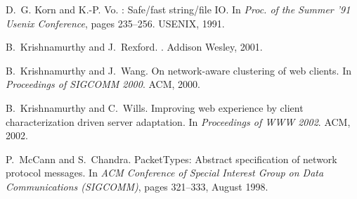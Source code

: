 \documentclass{sigplanconf}
\begin{document}
\begin{thebibliography}{10}
D.~G. Korn and K.-P. Vo.
: {S}afe/fast string/file {IO}.
\newblock In {\em Proc. of the Summer '91 Usenix Conference}, pages 235--256.
  USENIX, 1991.

B.~Krishnamurthy and J.~Rexford.
.
\newblock Addison Wesley, 2001.

B.~Krishnamurthy and J.~Wang.
\newblock On network-aware clustering of web clients.
\newblock In {\em Proceedings of SIGCOMM 2000}. ACM, 2000.

B.~Krishnamurthy and C.~Wills.
\newblock Improving web experience by client characterization driven server
  adaptation.
\newblock In {\em Proceedings of WWW 2002}. ACM, 2002.

P.~Mc{C}ann and S.~Chandra.
\newblock Packet{T}ypes: {A}bstract specification of network protocol messages.
\newblock In {\em {ACM} Conference of Special Interest Group on Data
  Communications (SIGCOMM)}, pages 321--333, August 1998.

\end{thebibliography}
\end{document}
